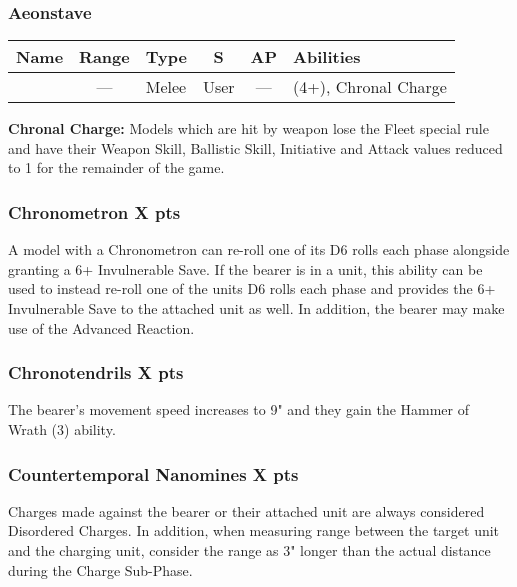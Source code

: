 \subsubsection{Aeonstave}
\label{Aeonstave}
\noindent
\begin{NiceTabular}{L{115 pt} c C{40pt} *{2}{c} >{\raggedright\arraybackslash}p{240pt}}
	Name & Range & Type & S & AP & Abilities \\
	\hline
	 & — & Melee & User & — &   (4+), Chronal Charge \\
\end{NiceTabular}

\textbf{Chronal Charge:} Models which are hit by weapon lose the Fleet special rule and have their Weapon Skill, Ballistic Skill, Initiative and Attack values reduced to 1 for the remainder of the game.

\subsubsection[Chronometron ]{Chronometron  \hrulefill X pts}

A model with a Chronometron can re-roll one of its D6 rolls each phase alongside granting a 6+ Invulnerable Save. If the bearer is in a unit, this ability can be used to instead re-roll one of the units D6 rolls each phase and provides the 6+ Invulnerable Save to the attached unit as well. In addition, the bearer may make use of the  Advanced Reaction.

\subsubsection[Chronotendrils ]{Chronotendrils  \hrulefill X pts}

The bearer's movement speed increases to 9" and they gain the Hammer of Wrath (3) ability.

\subsubsection[Countertemporal Nanomines ]{Countertemporal Nanomines  \hrulefill X pts}

Charges made against the bearer or their attached unit are always considered Disordered Charges. In addition, when measuring range between the target unit and the charging unit, consider the range as 3" longer than the actual distance during the Charge Sub-Phase.

